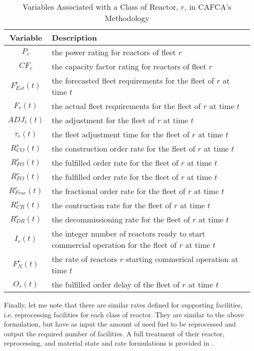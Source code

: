 \begin{table} [h!]
\centering
\begin{tabularx}{\textwidth-20pt}{|c|X|} %
\hline
Variable    & Description \\
\hline
$P_r$            & the power rating for reactors of fleet $r$ \\
$CF_r$           & the capacity factor rating for reactors of fleet $r$ \\
$F^r_{Est}(t)$   & the forecasted fleet requirements for the fleet of $r$ at time $t$  \\
$F_r(t)$         & the actual fleet requirements for the fleet of $r$ at time $t$  \\
$ADJ_r(t)$       & the adjustment for the fleet of $r$ at time $t$  \\
$\tau_r(t)$      & the fleet adjustment time for the fleet of $r$ at time $t$  \\
$R^r_{CO}(t)$    & the construction order rate for the fleet of $r$ at time $t$  \\
$R^r_{FO}(t)$    & the fulfilled order rate for the fleet of $r$ at time $t$  \\
$R^r_{FO}(t)$    & the fulfilled order rate for the fleet of $r$ at time $t$  \\
$R^r_{Frac}(t)$  & the fractional order rate for the fleet of $r$ at time $t$  \\
$R^r_{CR}(t)$    & the contruction rate for the fleet of $r$ at time $t$  \\
$R^r_{DR}(t)$    & the decommissioning rate for the fleet of $r$ at time $t$  \\
$I_r(t)$         & the integer number of reactors ready to start commercial operation for the fleet of $r$ at time $t$  \\
$F^r_N(t)$       & the rate of reactors $r$ starting commerical operation at time $t$ \\
$O_r(t)$         & the fulfilled order delay of the fleet of $r$ at time $t$ \\
\hline
\end{tabularx}
\caption{Variables Associated with a Class of Reactor, $r$, in CAFCA's Methodology}
\label{tbl:cafca-rxtr-vars}
\end{table}

Finally, let me note that there are similar rates defined for supporting
facilities, i.e. reprocessing facilities for each class of reactor. They are
similar to the above formulation, but have as input the amount of used fuel to
be reprocessed and output the required number of facilities. A full treatment of
their reactor, reprocessing, and material state and rate formulations is
provided in \cite{busquim_e_silva_system_2008}.

